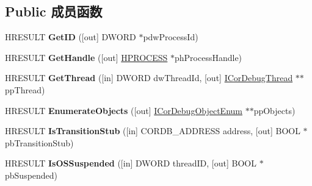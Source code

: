 \subsection*{Public 成员函数}
\begin{DoxyCompactItemize}
\item 
\mbox{\label{interface_i_cor_debug_process_a163ed3336b3a3192937cf225e5c18f14}} 
H\+R\+E\+S\+U\+LT {\bfseries Get\+ID} (\mbox{[}out\mbox{]} D\+W\+O\+RD $\ast$pdw\+Process\+Id)
\item 
\mbox{\label{interface_i_cor_debug_process_a81c4ea61d61e4aabdb0909f0aaa6fec5}} 
H\+R\+E\+S\+U\+LT {\bfseries Get\+Handle} (\mbox{[}out\mbox{]} \hyperlink{interfacevoid}{H\+P\+R\+O\+C\+E\+SS} $\ast$ph\+Process\+Handle)
\item 
\mbox{\label{interface_i_cor_debug_process_a111d8753036ff7db6c4b84fbe8613bd2}} 
H\+R\+E\+S\+U\+LT {\bfseries Get\+Thread} (\mbox{[}in\mbox{]} D\+W\+O\+RD dw\+Thread\+Id, \mbox{[}out\mbox{]} \hyperlink{interface_i_cor_debug_thread}{I\+Cor\+Debug\+Thread} $\ast$$\ast$pp\+Thread)
\item 
\mbox{\label{interface_i_cor_debug_process_ae7ff31e2d2a522870b0e92788b3b92a2}} 
H\+R\+E\+S\+U\+LT {\bfseries Enumerate\+Objects} (\mbox{[}out\mbox{]} \hyperlink{interface_i_cor_debug_object_enum}{I\+Cor\+Debug\+Object\+Enum} $\ast$$\ast$pp\+Objects)
\item 
\mbox{\label{interface_i_cor_debug_process_a8d190ce3cf4929679eaf83e279da1a26}} 
H\+R\+E\+S\+U\+LT {\bfseries Is\+Transition\+Stub} (\mbox{[}in\mbox{]} C\+O\+R\+D\+B\+\_\+\+A\+D\+D\+R\+E\+SS address, \mbox{[}out\mbox{]} B\+O\+OL $\ast$pb\+Transition\+Stub)
\item 
\mbox{\label{interface_i_cor_debug_process_a879f0fe8e2f9d9bffed610396bea4690}} 
H\+R\+E\+S\+U\+LT {\bfseries Is\+O\+S\+Suspended} (\mbox{[}in\mbox{]} D\+W\+O\+RD thread\+ID, \mbox{[}out\mbox{]} B\+O\+OL $\ast$pb\+Suspended)
\item 
\mbox{\label{interface_i_cor_debug_process_ab331d94547ebb9c9a7b3f31c540a6ec7}} 

\end{DoxyCompactItemize}
